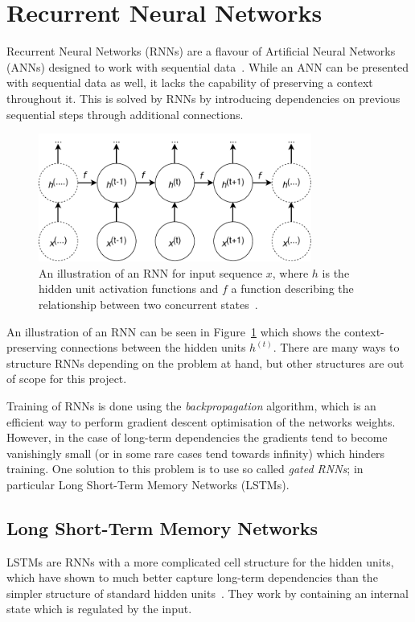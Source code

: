 \section{Recurrent Neural Networks}
Recurrent Neural Networks (RNNs) are a flavour of Artificial Neural Networks (ANNs) designed to work with sequential data~\cite{goodfellow2016deep}. While an ANN can be presented with sequential data as well, it lacks the capability of preserving a context throughout it. This is solved by RNNs by introducing dependencies on previous sequential steps through additional connections.
\begin{figure}[H]
  \centering
  \includegraphics[width=0.8\textwidth]{graphics/rnn-2}
  \caption{An illustration of an RNN for input sequence $x$, where $h$ is the hidden unit activation functions and $f$ a function describing the relationship between two concurrent states~\cite{goodfellow2016deep}.}\label{fig:rnn}
\end{figure}
An illustration of an RNN can be seen in Figure~\ref{fig:rnn} which
shows the context-preserving connections between the hidden units
$h^{(t)}$. There are many ways to structure RNNs depending on the
problem at hand, but other structures are out of scope for this project.

Training of RNNs is done using the \textit{backpropagation} algorithm, which is an efficient way to perform gradient descent optimisation of the networks weights. However, in the case of long-term dependencies the gradients tend to become vanishingly small (or in some rare cases tend towards infinity) which hinders training. One solution to this problem is to use so called \textit{gated RNNs}; in particular Long Short-Term Memory Networks (LSTMs).

\subsection{Long Short-Term Memory Networks}
LSTMs are RNNs with a more complicated cell structure for the hidden units, which have shown to much better capture long-term dependencies than the simpler structure of standard hidden units~\cite{hochreiter1997long}. They work by containing an internal state which is regulated by the input.

